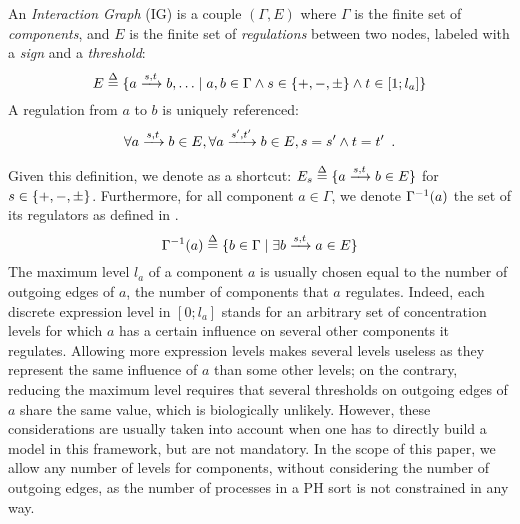\begin{definition}
\label{def:ig}
An \emph{Interaction Graph} (IG) is a couple $(\Gamma, E)$ where $\Gamma$ is the finite set of \emph{components},
and $E$
is the finite set of 
\emph{regulations} between two nodes, labeled with a \emph{sign} and a \emph{threshold}:
$$E \stackrel{\Delta}= \{ a \xrightarrow{s, t} b, \ldots \mid a, b \in \Gamma \wedge s \in \{ +, -, \pm \} \wedge t \in [1; l_a]\}$$
A regulation from $a$ to $b$ is uniquely referenced:
$$\forall a \xrightarrow{s, t} b \in E, \forall a \xrightarrow{s', t'} b \in E, s = s' \wedge t = t' \enspace.$$
\end{definition}

Given this definition, we denote as a shortcut:
$E_s \stackrel{\Delta}= \{ a \xrightarrow{s, t} b \in E \}$
for $s \in \{ +, -, \pm \}$.
Furthermore, for all component $a \in \Gamma$, 
we denote $\Gamma^{-1}(a)$ the set of its regulators as defined in .
\[
  \label{eq:grn-regulators}
  \Gamma^{-1}(a) \stackrel{\Delta}= \{ b\in\Gamma\mid \exists b \xrightarrow{s, t} a \in E \}
\]
The maximum level $l_a$ of a component $a$ is usually chosen equal to the number of outgoing edges of $a$, \ie the number of components that $a$ regulates.
Indeed, each discrete expression level in $[0 ; l_a]$ stands for an arbitrary set of concentration levels for which $a$ has a certain influence on several other components it regulates.
Allowing more expression levels makes several levels useless as they represent the same influence of $a$ than some other levels;
on the contrary, reducing the maximum level requires that several thresholds on outgoing edges of $a$ share the same value, which is biologically unlikely.
However, these considerations are usually taken into account when one has to directly build a model in this framework, but are not mandatory.
In the scope of this paper, we allow any number of levels for components, without considering the number of outgoing edges,
as the number of processes in a PH sort is not constrained in any way.


